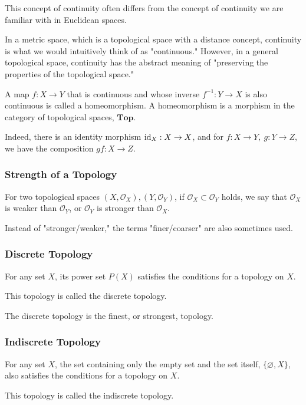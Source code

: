 \documentclass[article,letterpaper,12pt]{jsarticle}
\begin{document}
This concept of continuity often differs from the concept of continuity we are familiar with in Euclidean spaces.

In a metric space, which is a topological space with a distance concept, continuity is what we would intuitively think of as "continuous." However, in a general topological space, continuity has the abstract meaning of "preserving the properties of the topological space."

A map $f: X \to Y$ that is continuous and whose inverse $f^{-1}: Y \to X$ is also continuous is called a homeomorphism.
A homeomorphism is a morphism in the category of topological spaces, $\mathbf{Top}$.

Indeed, there is an identity morphism ${\rm id}_{X}: X \to X$, and for $f: X \to Y, \ g: Y \to Z$, we have the composition $g f : X \to Z$.


\subsubsection{Strength of a Topology}

For two topological spaces $(X, {\mathcal O}_{X}), (Y, {\mathcal O}_{Y})$, if
${\mathcal O}_{X} \subset {\mathcal O}_{Y}$
holds, we say that
${\mathcal O}_{X}$ is weaker than ${\mathcal O}_{Y}$,
or ${\mathcal O}_{Y}$ is stronger than ${\mathcal O}_{X}$.

Instead of "stronger/weaker," the terms "finer/coarser" are also sometimes used.


\subsubsection{Discrete Topology}

For any set $X$, its power set $P(X)$ satisfies the conditions for a topology on $X$.

This topology is called the discrete topology.

The discrete topology is the finest, or strongest, topology.


\subsubsection{Indiscrete Topology}

For any set $X$, the set containing only the empty set and the set itself, $\{ \varnothing, X \}$, also satisfies the conditions for a topology on $X$.

This topology is called the indiscrete topology.
\end{document}
